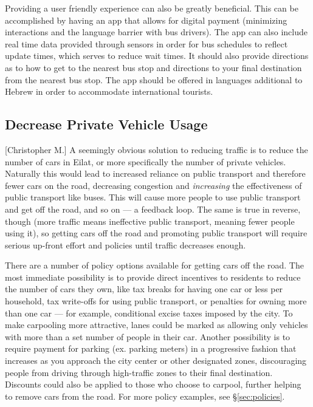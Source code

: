 \documentclass[12pt]{article}                               %
\begin{document}
Providing a user friendly experience can also be greatly beneficial. This can be accomplished by having an app that allows for digital payment (minimizing interactions and the language barrier with bus drivers). The app can also include real time data provided through sensors in order for bus schedules to reflect update times, which serves to reduce wait times. It should also provide directions as to how to get to the nearest bus stop and directions to your final destination from the nearest bus stop. The app should be offered in languages additional to Hebrew in order to accommodate international tourists. 

\subsection{Decrease Private Vehicle Usage}[Christopher M.]
A seemingly obvious solution to reducing traffic is to reduce the number of cars in Eilat, or more specifically the number of private vehicles. Naturally this would lead to increased reliance on public transport and therefore fewer cars on the road, decreasing congestion and \textit{increasing} the effectiveness of public transport like buses. This will cause more people to use public transport and get off the road, and so on --- a feedback loop. The same is true in reverse, though (more traffic means ineffective public transport, meaning fewer people using it), so getting cars off the road and promoting public transport will require serious up-front effort and policies until traffic decreases enough.

There are a number of policy options available for getting cars off the road. The most immediate possibility is to provide direct incentives to residents to reduce the number of cars they own, like tax breaks for having one car or less per household, tax write-offs for using public transport, or penalties for owning more than one car --- for example, conditional excise taxes imposed by the city. To make carpooling more attractive, lanes could be marked as allowing only vehicles with more than a set number of people in their car. Another possibility is to require payment for parking (ex. parking meters) in a progressive fashion that increases as you approach the city center or other designated zones, discouraging people from driving through high-traffic zones to their final destination. Discounts could also be applied to those who choose to carpool, further helping to remove cars from the road. For more policy examples, see \S\ref{sec:policies}.
\end{document}
